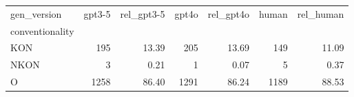 \begin{tabular}{lrrrrrr}
\toprule
gen_version & gpt3-5 & rel_gpt3-5 & gpt4o & rel_gpt4o & human & rel_human \\
conventionality &  &  &  &  &  &  \\
\midrule
KON & 195 & 13.39 & 205 & 13.69 & 149 & 11.09 \\
NKON & 3 & 0.21 & 1 & 0.07 & 5 & 0.37 \\
O & 1258 & 86.40 & 1291 & 86.24 & 1189 & 88.53 \\
\bottomrule
\end{tabular}
